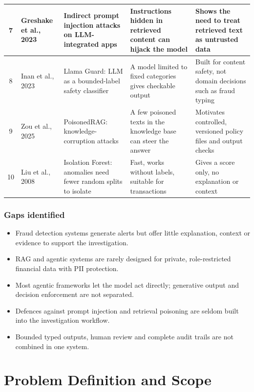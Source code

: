 \documentclass[oneside,a4paper,12pt]{report}
\begin{document}
{\begin{longtable}{|c|p{2.2cm}|p{3.2cm}|p{3.2cm}|p{3.3cm}|}
7 & Greshake et al., 2023 \cite{greshake2023indirect} & Indirect prompt injection attacks on LLM-integrated apps & Instructions hidden in retrieved content can hijack the model & Shows the need to treat retrieved text as untrusted data \\ \hline
8 & Inan et al., 2023 \cite{inan2023llamaguard} & Llama Guard: LLM as a bounded-label safety classifier & A model limited to fixed categories gives checkable output & Built for content safety, not domain decisions such as fraud typing \\ \hline
9 & Zou et al., 2025 \cite{zou2025poisonedrag} & PoisonedRAG: knowledge-corruption attacks & A few poisoned texts in the knowledge base can steer the answer & Motivates controlled, versioned policy files and output checks \\ \hline
10 & Liu et al., 2008 \cite{liu2008isolation} & Isolation Forest: anomalies need fewer random splits to isolate & Fast, works without labels, suitable for transactions & Gives a score only, no explanation or context \\ \hline
\end{longtable}
}

\subsection*{Gaps identified}
\begin{itemize}
  \item Fraud detection systems generate alerts but offer little explanation, context or evidence to support the investigation.
  \item RAG and agentic systems are rarely designed for private, role-restricted financial data with PII protection.
  \item Most agentic frameworks let the model act directly; generative output and decision enforcement are not separated.
  \item Defences against prompt injection and retrieval poisoning are seldom built into the investigation workflow.
  \item Bounded typed outputs, human review and complete audit trails are not combined in one system.
\end{itemize}

\chapter{Problem Definition and Scope}
\end{document}
